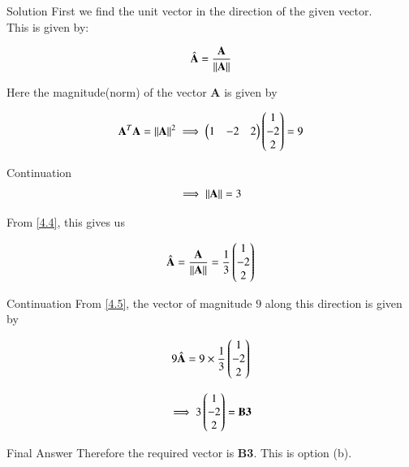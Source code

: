 \documentclass{beamer}
\begin{document}
\begin{frame}{Solution}
    First we find the unit vector in the direction of the given vector.\\
This is given by:

\begin{align}
    \hat{\textbf{A}} = \frac{\textbf{A}}{\left\lVert\textbf{A}\right\rVert}
    \label{4.2}
\end{align}

Here the magnitude(norm) of the vector \textbf{A} is given by

\begin{align}
    \textbf{A}^T\textbf{A} = \left\lVert\textbf{A}\right\rVert^2
    \label{4.3}
    \implies \begin{pmatrix}1 & -2 & 2\end{pmatrix} \begin{pmatrix}1 \\ -2 \\ 2\end{pmatrix} = 9
\end{align}
\end{frame}

\begin{frame}{Continuation}
\begin{align}
    \implies \left\lVert\textbf{A}\right\rVert = 3
    \label{4.4}
\end{align}

From \ref{4.4}, this gives us

\begin{align}
    \hat{\textbf{A}} = \frac{\textbf{A}}{\left\lVert\textbf{A}\right\rVert} = \frac{1}{3} \begin{pmatrix}1 \\ -2 \\ 2\end{pmatrix}
    \label{4.5}
\end{align}
\end{frame}

\begin{frame}{Continuation}
From \ref{4.5}, the vector of magnitude $9$ along this direction is given by

\begin{align}
    9\hat{\textbf{A}} = 9 \times \frac{1}{3}\begin{pmatrix}1 \\ -2 \\ 2\end{pmatrix}
    \label{4.6}
\end{align}

\begin{align}
    \implies 3\begin{pmatrix}1 \\ -2 \\ 2\end{pmatrix} = \textbf{B3}
    \label{4.7}
\end{align}
\end{frame}


\begin{frame}{Final Answer}
Therefore the required vector is \textbf{B3}. This is option (b).\\
\end{frame}
\end{document}
